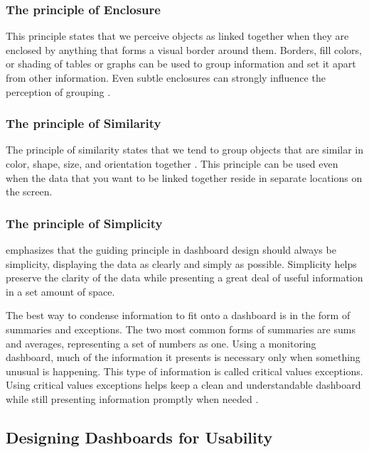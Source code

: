 \subsubsection{The principle of Enclosure}
\label{subsubsec:principle_enclosure}


This principle states that we perceive objects as linked together when they are enclosed by anything that forms a visual border around them. Borders, fill colors, or shading of tables or graphs can be used to group information and set it apart from other information. Even subtle enclosures can strongly influence the perception of grouping \autocite[p. 76]{FewDashboard}.

\subsubsection{The principle of Similarity}
\label{subsubsec:principle_similarity}


The principle of similarity states that we tend to group objects that are similar in color, shape, size, and orientation together \autocite[p. 75-76]{FewDashboard}. This principle can be used even when the data that you want to be linked together reside in separate locations on the screen. 

\subsubsection{The principle of Simplicity}
\label{subsubsec:principle_simplicity}


\textcite{FewDashboard} emphasizes that the guiding principle in dashboard design should always be simplicity, displaying the data as clearly and simply as possible. Simplicity helps preserve the clarity of the data while presenting a great deal of useful information in a set amount of space.

The best way to condense information to fit onto a dashboard is in the form of summaries and exceptions. The two most common forms of summaries are sums and averages, representing a set of numbers as one. Using a monitoring dashboard, much of the information it presents is necessary only when something unusual is happening. This type of information is called critical values exceptions. Using critical values exceptions helps keep a clean and understandable dashboard while still presenting information promptly when needed \autocite[p. 82]{FewDashboard}.

\subsection{Designing Dashboards for Usability}
\label{subsec:designing_dashboards_for_usability}

